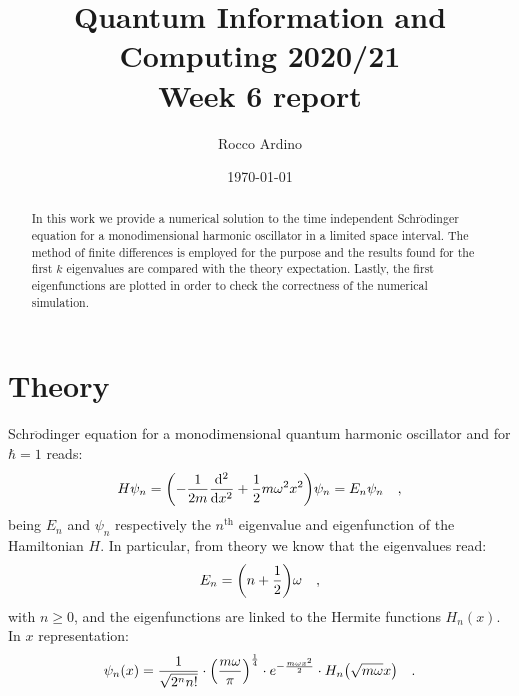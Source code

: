 \documentclass[pra, onecolumn, notitlepage, floats, 11pt]{revtex4-1}
\begin{document}
\title{Quantum Information and Computing 2020/21\\Week 6 report}

\author{Rocco Ardino}

\date{\today}





\begin{abstract}
    In this work we provide a numerical solution to the time independent Schr$\mathrm{\ddot{o}}$dinger equation for a monodimensional harmonic oscillator in a limited space interval. The method of finite differences is employed for the purpose and the results found for the first \( k \) eigenvalues are compared with the theory expectation. Lastly, the first eigenfunctions are plotted in order to check the correctness of the numerical simulation.
\end{abstract}

\maketitle




\section{Theory}
Schr$\mathrm{\ddot{o}}$dinger equation for a monodimensional quantum harmonic oscillator and for \( \hbar = 1 \) reads:
\begin{equation}
    H \psi_{n}
    =
    \qty(- \frac{1}{2m} \dv[2]{}{x} + \frac{1}{2} m \omega^2 x^2) \psi_{n}
    =
    E_{n} \psi_{n}
    \quad ,
    \label{eq:06_T_1}
\end{equation}
being \( E_{n} \) and \( \psi_{n} \) respectively the \( n^{\text{th}} \) eigenvalue and eigenfunction of the Hamiltonian \( H \). In particular, from theory we know that the eigenvalues read:
\begin{equation}
    E_{n}
    =
    \qty(n + \frac{1}{2}) \omega
    \quad ,
    \label{eq:06_T_2}
\end{equation}
with \( n \ge 0 \), and the eigenfunctions are linked to the Hermite functions \( H_{n}(x) \). In \( x \) representation:
\begin{equation}
    \psi_{n}(x)
    =
    \frac{1}{\sqrt{2^{n}n!}}
    \cdot
    \qty(\frac{m\omega}{\pi})^{\frac{1}{4}}
    \cdot
    e^{-\frac{m \omega x^2}{2}}
    \cdot
    H_{n}\qty(\sqrt{m \omega} x)
    \quad .
    \label{eq:06_T_3}
\end{equation}
\end{document}
